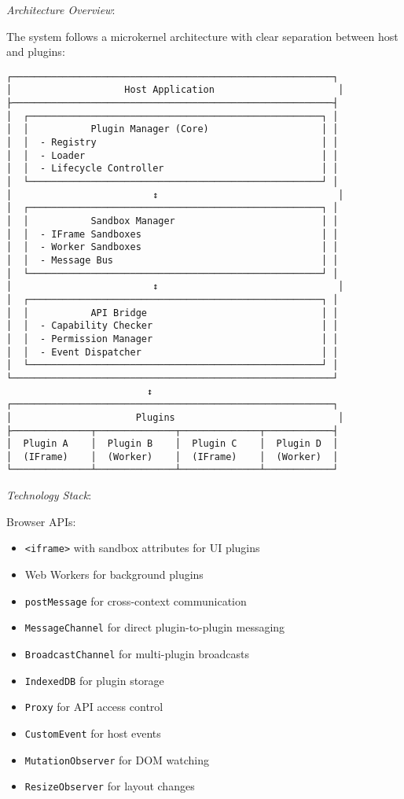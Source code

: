 \documentclass[11pt]{article}
\begin{document}
\emph{Architecture Overview}:

The system follows a microkernel architecture with clear separation between host and plugins:

\begin{verbatim}
┌─────────────────────────────────────────────────────────┐
│                    Host Application                      │
├─────────────────────────────────────────────────────────┤
│  ┌────────────────────────────────────────────────────┐ │
│  │           Plugin Manager (Core)                    │ │
│  │  - Registry                                        │ │
│  │  - Loader                                          │ │
│  │  - Lifecycle Controller                            │ │
│  └────────────────────────────────────────────────────┘ │
│                         ↕                                │
│  ┌────────────────────────────────────────────────────┐ │
│  │           Sandbox Manager                          │ │
│  │  - IFrame Sandboxes                                │ │
│  │  - Worker Sandboxes                                │ │
│  │  - Message Bus                                     │ │
│  └────────────────────────────────────────────────────┘ │
│                         ↕                                │
│  ┌────────────────────────────────────────────────────┐ │
│  │           API Bridge                               │ │
│  │  - Capability Checker                              │ │
│  │  - Permission Manager                              │ │
│  │  - Event Dispatcher                                │ │
│  └────────────────────────────────────────────────────┘ │
└─────────────────────────────────────────────────────────┘
                         ↕
┌─────────────────────────────────────────────────────────┐
│                      Plugins                             │
├──────────────┬──────────────┬──────────────┬────────────┤
│  Plugin A    │  Plugin B    │  Plugin C    │  Plugin D  │
│  (IFrame)    │  (Worker)    │  (IFrame)    │  (Worker)  │
└──────────────┴──────────────┴──────────────┴────────────┘
\end{verbatim}

\emph{Technology Stack}:

Browser APIs:

\begin{itemize}
\item \texttt{<iframe>} with sandbox attributes for UI plugins
\item Web Workers for background plugins
\item \texttt{postMessage} for cross-context communication
\item \texttt{MessageChannel} for direct plugin-to-plugin messaging
\item \texttt{BroadcastChannel} for multi-plugin broadcasts
\item \texttt{IndexedDB} for plugin storage
\item \texttt{Proxy} for API access control
\item \texttt{CustomEvent} for host events
\item \texttt{MutationObserver} for DOM watching
\item \texttt{ResizeObserver} for layout changes
\end{itemize}
\end{document}
